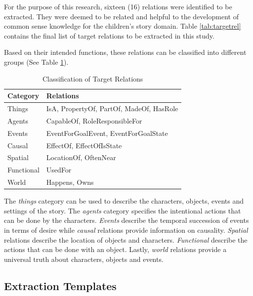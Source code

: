 For the purpose of this research, sixteen (16) relations were identified to be extracted. They were deemed to be related and helpful to the development of common sense knowledge for the children's story domain. Table \ref{tab:targetrel} contains the final list of target relations to be extracted in this study.

Based on their intended functions, these relations can be classified into different groups (See Table \ref{tab:classification}). 

\begin{table}[H]   %
\centering
\caption{Classification of Target Relations} \vspace{0.25em}
\begin{tabular}{|p{4cm}|p{6.5cm}|} \hline
Category & Relations \\ \hline
Things		& IsA, PropertyOf, PartOf, MadeOf, HasRole \\ \hline
Agents		& CapableOf, RoleResponsibleFor \\ \hline
Events		& EventForGoalEvent, EventForGoalState \\ \hline
Causal		& EffectOf, EffectOfIsState \\ \hline
Spatial		& LocationOf, OftenNear \\ \hline
Functional	& UsedFor \\ \hline
World		& Happens, Owns \\ \hline
\end{tabular}
\label{tab:classification}
\end{table}

The \textit{things} category can be used to describe the characters, objects, events and settings of the story. The \textit{agents} category specifies the intentional actions that can be done by the characters. \textit{Events} describe the temporal succession of events in terms of desire while \textit{causal} relations provide information on causality. \textit{Spatial} relations describe the location of objects and characters. \textit{Functional} describe the actions that can be done with an object. Lastly, \textit{world} relations provide a universal truth about characters, objects and events.

\subsection{Extraction Templates}
\label{sec:extractiontemplates}


